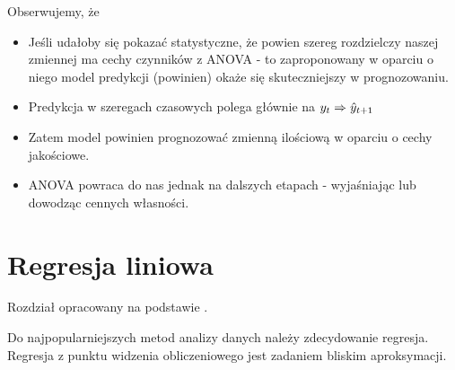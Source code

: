 \documentclass[10pt,a4paper]{book}
\begin{document}
Obserwujemy, że
\begin{itemize}
\item Jeśli udałoby się pokazać statystyczne, że powien szereg rozdzielczy naszej zmiennej ma cechy czynników z ANOVA - to zaproponowany w oparciu o niego model predykcji (powinien) okaże się skuteczniejszy w prognozowaniu.
\item Predykcja w szeregach czasowych polega głównie na $y_t \Rightarrow \predict{y}{t+1}$
\item Zatem model powinien prognozować zmienną ilościową w oparciu o cechy jakościowe.
\item ANOVA powraca do nas jednak na dalszych etapach - wyjaśniając lub dowodząc cennych własności.
\end{itemize}

\section{Regresja liniowa}

Rozdział opracowany na podstawie \cite{montgomery2015introduction}.

Do najpopularniejszych metod analizy danych należy zdecydowanie regresja. Regresja z punktu widzenia obliczeniowego jest zadaniem bliskim aproksymacji.
\end{document}
